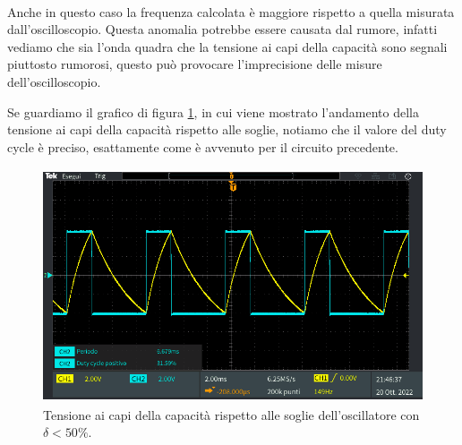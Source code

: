\documentclass{report}
\begin{document}
\\[4pt]Anche in questo caso la frequenza calcolata è maggiore rispetto a quella misurata dall'oscilloscopio.  Questa anomalia potrebbe essere causata dal rumore, infatti vediamo che sia l’onda quadra che la tensione ai capi della capacità sono segnali piuttosto rumorosi, questo può provocare l’imprecisione delle misure dell’oscilloscopio.\par
 Se guardiamo il grafico di figura \ref{figura:oscillo4_2_soglie}, in cui viene mostrato l'andamento della tensione ai capi della capacità rispetto alle soglie, notiamo che il valore del duty cycle è preciso, esattamente come è avvenuto per il circuito precedente. 
\begin{figure}[h!]
	\centering
	\includegraphics[height=6.9cm]{immagini/TEK00036}
	\caption{Tensione ai capi della capacità rispetto alle soglie dell'oscillatore con $\delta<50\%$.}
	\label{figura:oscillo4_2_soglie}
\end{figure}

\end{document}
